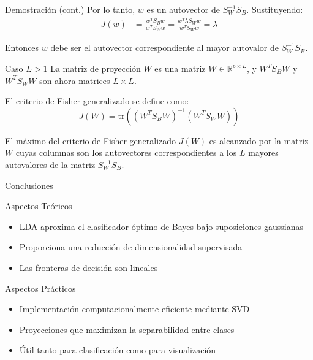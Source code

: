 \documentclass[spanish]{beamer}
\begin{document}
\begin{frame}{Demostración (cont.)}
Por lo tanto, $w$ es un autovector de $S_W^{-1} S_B$. Sustituyendo:
\begin{align*}
J(w) &= \frac{w^T S_B w}{w^T S_W w} = \frac{w^T \lambda S_W w}{w^T S_W w} = \lambda
\end{align*}

Entonces $w$ debe ser el autovector correspondiente al mayor autovalor de $S_W^{-1} S_B$.
\end{frame}

\begin{frame}{Caso $L>1$}
La matriz de proyección $W$ es una matriz $W \in \mathbb{R}^{p \times L}$, y $W^T S_B W$ y $W^T S_W W$ son ahora matrices $L \times L$.

\begin{definition}
El criterio de Fisher generalizado se define como:
\[
J(W) = \text{tr}((W^T S_B W)^{-1} (W^T S_W W))
\]
\end{definition}

\begin{theorem}
El máximo del criterio de Fisher generalizado $J(W)$ es alcanzado por la matriz $W$ cuyas columnas son los autovectores correspondientes a los $L$ mayores autovalores de la matriz $S_W^{-1} S_B$.
\end{theorem}
\end{frame}

\begin{frame}{Conclusiones}
\begin{block}{Aspectos Teóricos}
\begin{itemize}
    \item LDA aproxima el clasificador óptimo de Bayes bajo suposiciones gaussianas
    \item Proporciona una reducción de dimensionalidad supervisada
    \item Las fronteras de decisión son lineales
\end{itemize}
\end{block}

\begin{block}{Aspectos Prácticos}
\begin{itemize}
    \item Implementación computacionalmente eficiente mediante SVD
    \item Proyecciones que maximizan la separabilidad entre clases
    \item Útil tanto para clasificación como para visualización
\end{itemize}
\end{block}
\end{frame}
\end{document}
